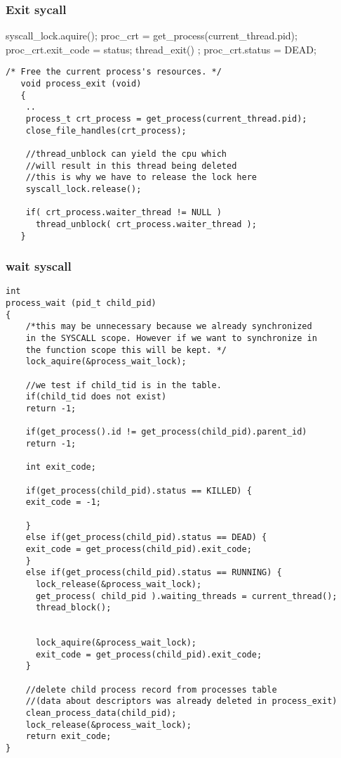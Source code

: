     \subsubsection{Exit sycall}
    \vspace{-3em} %
      \begin{program}
	syscall\_lock.aquire();
	proc\_crt = get\_process(current\_thread.pid);
	proc\_crt.exit\_code = status;
	thread\_exit() ;
	proc\_crt.status = DEAD;
      \end{program}
    \begin{lstlisting}
/* Free the current process's resources. */	
   void process_exit (void)
   {
    ..
    process_t crt_process = get_process(current_thread.pid);
    close_file_handles(crt_process);
    
    //thread_unblock can yield the cpu which
    //will result in this thread being deleted
    //this is why we have to release the lock here
    syscall_lock.release();
    
    if( crt_process.waiter_thread != NULL ) 
      thread_unblock( crt_process.waiter_thread );
   }
    \end{lstlisting}

    \newpage

    \subsubsection{wait syscall}
    \vspace{-1em} %
    \begin{lstlisting}
int
process_wait (pid_t child_pid) 
{
    /*this may be unnecessary because we already synchronized
    in the SYSCALL scope. However if we want to synchronize in
    the function scope this will be kept. */
    lock_aquire(&process_wait_lock);
    
    //we test if child_tid is in the table.
    if(child_tid does not exist) 
	return -1;

    if(get_process().id != get_process(child_pid).parent_id)
	return -1;

    int exit_code;

    if(get_process(child_pid).status == KILLED) {
	exit_code = -1;
	
    }
    else if(get_process(child_pid).status == DEAD) {
	exit_code = get_process(child_pid).exit_code;            
    }
    else if(get_process(child_pid).status == RUNNING) {
      lock_release(&process_wait_lock);
      get_process( child_pid ).waiting_threads = current_thread();
      thread_block();


      lock_aquire(&process_wait_lock);
      exit_code = get_process(child_pid).exit_code;
    }

    //delete child process record from processes table 
    //(data about descriptors was already deleted in process_exit)
    clean_process_data(child_pid);
    lock_release(&process_wait_lock);
    return exit_code;
}
    \end{lstlisting}



